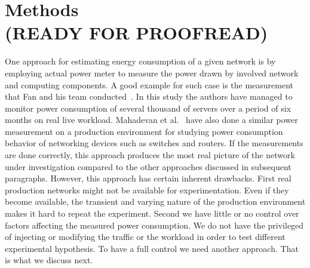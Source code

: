 \chapter{Methods\\(READY FOR PROOFREAD)}
\label{chapter:methods}



One approach for estimating energy consumption of a given network is by employing actual power meter to measure the power drawn by involved network and computing components. A good example for such case is the measurement that Fan and his team conducted~\cite{DBLP:conf/isca/FanWB07}. In this study the authors have managed to monitor power consumption of several thousand of servers over a period of six months on real live workload. Mahadevan et al.{\ } have also done a similar power measurement on a production environment for studying power consumption behavior of networking devices such as switches and routers. If the measurements are done correctly, this approach produces the most real picture of the network under investigation compared to the other approaches discussed in subsequent paragraphs. However, this approach has certain inherent drawbacks. First real production networks might not be available for experimentation. Even if they become available, the transient and varying nature of the production environment makes it hard to repeat the experiment. Second we have little or no control over factors affecting the measured power consumption. We do not have the privileged of injecting or modifying the traffic or the workload in order to test different experimental hypothesis. To have a full control we need another approach. That is what we discuss next.


